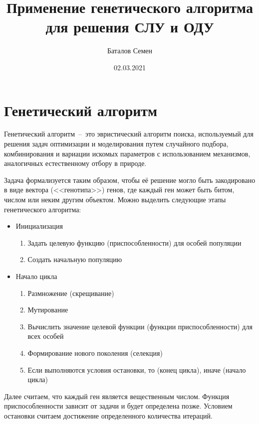 \documentclass[12pt, a4paper]{article}
\title{Применение генетического алгоритма для решения СЛУ и ОДУ}
\author{Баталов Семен}
\date{02.03.2021}
\begin{document}
    
    \sloppy
    
    \maketitle
    
    \section{Генетический алгоритм}
    
    Генетический алгоритм~--~это эвристический алгоритм поиска, используемый 
    для решения задач оптимизации и моделирования путем случайного подбора, 
    комбинирования и вариации искомых параметров с использованием 
    механизмов, аналогичных естественному отбору в природе.
    
    Задача формализуется таким образом, чтобы её решение могло быть 
    закодировано в виде вектора (<<генотипа>>) генов, где каждый ген может 
    быть битом, числом или неким другим объектом. Можно выделить следующие 
    этапы генетического алгоритма:
    
    \begin{itemize}
        \item Инициализация
            \begin{enumerate}
                \item Задать целевую функцию (приспособленности) для особей 
                популяции
                \item Создать начальную популяцию
            \end{enumerate}
        \item Начало цикла
            \begin{enumerate}
                \item Размножение (скрещивание)
                \item Мутирование
                \item Вычислить значение целевой функции (функции 
                приспособленности) для всех особей
                \item Формирование нового поколения (селекция)
                \item Если выполняются условия остановки, то (конец цикла), 
                иначе (начало цикла)
            \end{enumerate}
    \end{itemize}
    
    Далее считаем, что каждый ген является вещественным числом. Функция 
    приспособленности зависит от задачи и будет определена позже. Условием 
    остановки считаем достижение определенного количества итераций.
    
\end{document}
